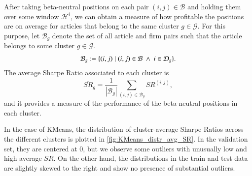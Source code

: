 After taking beta-neutral positions on each pair $(i,j)\in\mathcal B$ and holding them over some window $\mathcal H^i$, we can obtain a measure of how profitable the positions are on average for articles that belong to the same cluster $g\in\mathcal G$. For this purpose, let $\mathcal{B}_g$ denote the set of all article and firm pairs such that the article belongs to some cluster $g\in\mathcal G$. 
$$
\mathcal{B}_g:= \{(i,j) \mid (i,j)\in\mathcal{B} ~\wedge~ i \in \mathcal{D}_g \}
.
$$
The average Sharpe Ratio associated to each cluster is
$$
\overline{S R}_g=\frac{1}{\left|\mathcal{B}_g\right|} \sum_{(i,j) \in \mathcal{B}_g} S R^{(i,j)}
,
$$
and it provides a measure of the performance of the beta-neutral positions in each cluster. 


In the case of KMeans, the distribution of cluster-average Sharpe Ratios across the different clusters is plotted in \cref{fig:KMeans_distr_avg_SR}. In the validation set, they are centered at 0, but we observe some outliers with unusually low and high average $SR$. On the other hand, the distributions in the train and test data are slightly skewed to the right and show no presence of substantial outliers.

